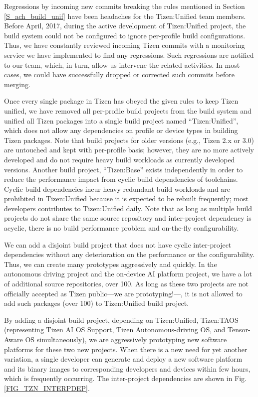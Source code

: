 Regressions by incoming new commits breaking the rules mentioned in Section \ref{S_ach_build_unif} have been headaches for the Tizen:Unified team members. Before April, 2017, during the active development of Tizen:Unified project, the build system could not be configured to ignore per-profile build configurations. Thus, we have constantly reviewed incoming Tizen commits with a monitoring service we have implemented to find any regressions. Such regressions are notified to our team, which, in turn, allow us intervene the related activities. In most cases, we could have successfully dropped or corrected such commits before merging.


Once every single package in Tizen has obeyed the given rules to keep Tizen unified, we have removed all per-profile build projects from the build system and unified all Tizen packages into a single build project named “Tizen:Unified”, which does not allow any dependencies on profile or device types in building Tizen packages. Note that build projects for older versions (e.g., Tizen 2.x or 3.0) are untouched and kept with per-profile basis; however, they are no more actively developed and do not require heavy build workloads as currently developed versions. Another build project, “Tizen:Base” exists independently in order to reduce the performance impact from cyclic build dependencies of toolchains. Cyclic build dependencies incur heavy redundant build workloads and are prohibited in Tizen:Unified because it is expected to be rebuilt frequently; most developers contributes to Tizen:Unified daily. Note that as long as multiple build projects do not share the same source repository and inter-project dependency is acyclic, there is no build performance problem and on-the-fly configurability.


We can add a disjoint build project that does not have cyclic inter-project dependencies without any deterioration on the performance or the configurability. Thus, we can create many prototypes aggressively and quickly. In the autonomous driving project and the on-device AI platform project, we have a lot of additional source repositories, over 100. As long as these two projects are not officially accepted as Tizen public—we are prototyping!—, it is not allowed to add such packages (over 100) to Tizen:Unified build project.


By adding a disjoint build project, depending on Tizen:Unified, Tizen:TAOS (representing Tizen AI OS Support, Tizen Autonomous-driving OS, and Tensor-Aware OS simultaneously), we are aggressively prototyping new software platforms for these two new projects. When there is a new need for yet another variation, a single developer can generate and deploy a new software platform and its binary images to corresponding developers and devices within few hours, which is frequently occurring. The inter-project dependencies are shown in Fig. \ref{FIG_TZN_INTERPDEP}.

